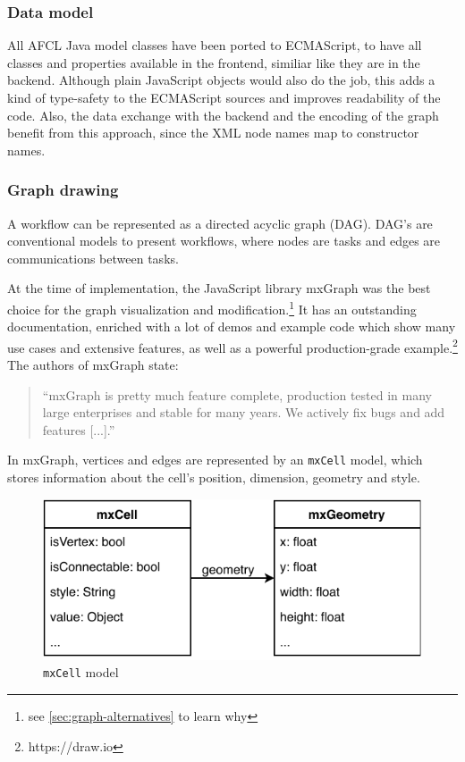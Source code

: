 \documentclass[a4paper,top=25mm,bottom=25mm,12pt,pdftex,halfparskip,twoside,bibtotoc,numbers=noenddot]{scrbook}
\begin{document}
\subsubsection{Data model}

All AFCL Java model classes have been ported to ECMAScript, to have all classes and properties available in the frontend, similiar like they are in the backend. Although plain JavaScript objects would also do the job, this adds a kind of type-safety to the ECMAScript sources and improves readability of the code. Also, the data exchange with the backend and the encoding of the graph benefit from this approach, since the XML node names map to constructor names.

\subsubsection{Graph drawing}

A workflow can be represented as a directed acyclic graph (DAG). DAG's are conventional models to present workflows, where nodes are tasks and edges are communications between tasks.

At the time of implementation, the JavaScript library mxGraph was the best choice for the graph visualization and modification.\footnote{see \ref{sec:graph-alternatives} to learn why}
It has an outstanding documentation, enriched with a lot of demos and example code which show many use cases and extensive features, as well as a powerful production-grade example.\footnote{https://draw.io}\\
The authors of mxGraph state:\\
\begin{quote}
``mxGraph is pretty much feature complete, production tested in many large enterprises and stable for many years. We actively fix bugs and add features [...].''
\end{quote}

In mxGraph, vertices and edges are represented by an \texttt{mxCell} model, which stores information about the cell's position, dimension, geometry and style.

\begin{figure}[H]
  \centering
  \vspace{0.8cm}
  \includegraphics[]{mxCell}
  \caption{\texttt{mxCell} model}
\end{figure}
\end{document}
